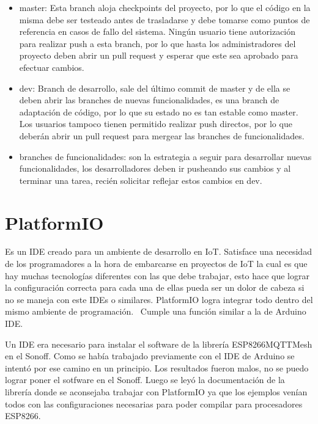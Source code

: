 \begin{itemize}

\item master: Esta branch aloja checkpoints del proyecto, por lo que el código en la misma debe ser testeado antes de trasladarse y debe tomarse como puntos de referencia en casos de fallo del sistema. Ningún usuario tiene autorización para realizar push a esta branch, por lo que hasta los administradores del proyecto deben abrir un pull request y esperar que este sea aprobado para efectuar cambios.

\item dev: Branch de desarrollo, sale del último commit de master y de ella se deben abrir las branches de nuevas funcionalidades, es una branch de adaptación de código, por lo que su estado no es tan estable como master. Los usuarios tampoco tienen permitido realizar push directos, por lo que deberán abrir un pull request para mergear las branches de funcionalidades.

\item branches de funcionalidades: son la estrategia a seguir para desarrollar nuevas funcionalidades, los desarrolladores deben ir pusheando sus cambios y al terminar una tarea, recién solicitar reflejar estos cambios en dev.

\end{itemize}

\section{PlatformIO}
Es un IDE creado para un ambiente de desarrollo en IoT. Satisface una necesidad de los programadores a la hora de embarcarse en proyectos de IoT la cual es que hay muchas tecnologías diferentes con las que debe trabajar, esto hace que lograr la configuración correcta para cada una de ellas pueda ser un dolor de cabeza si no se maneja con este IDEs o similares. PlatformIO logra  integrar todo dentro del mismo ambiente de programación.~\cite{PlatformIODocs} Cumple una función similar a la de Arduino IDE.

Un IDE era necesario para instalar el software de la librería ESP8266MQTTMesh en el Sonoff. Como se había trabajado previamente con el IDE de Arduino se intentó por ese camino en un principio. Los resultados fueron malos, no se puedo lograr poner el sotfware en el Sonoff. Luego se leyó la documentación de la librería donde se aconsejaba trabajar con PlatformIO ya que los ejemplos venían todos con las configuraciones necesarias para poder compilar para procesadores ESP8266. 


